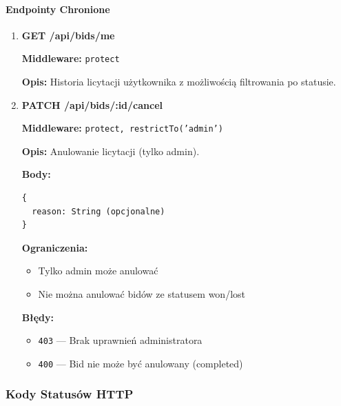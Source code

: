 \paragraph{Endpointy Chronione}

\begin{enumerate}
  \item \textbf{GET /api/bids/me}

        \textbf{Middleware:} \texttt{protect}

        \textbf{Opis:} Historia licytacji użytkownika z możliwością filtrowania po statusie.

  \item \textbf{PATCH /api/bids/:id/cancel}

        \textbf{Middleware:} \texttt{protect, restrictTo('admin')}

        \textbf{Opis:} Anulowanie licytacji (tylko admin).

        \textbf{Body:}
        \begin{lstlisting}
{
  reason: String (opcjonalne)
}
\end{lstlisting}

        \textbf{Ograniczenia:}
        \begin{itemize}
          \item Tylko admin może anulować
          \item Nie można anulować bidów ze statusem won/lost
        \end{itemize}

        \textbf{Błędy:}
        \begin{itemize}
          \item \texttt{403} --- Brak uprawnień administratora
          \item \texttt{400} --- Bid nie może być anulowany (completed)
        \end{itemize}
\end{enumerate}

\subsubsection{Kody Statusów HTTP}

